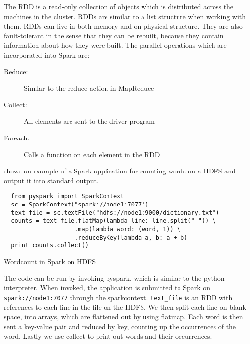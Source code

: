 The RDD is a read-only collection of objects which is distributed across the machines in the cluster. RDDs are similar to a list structure when working with them. RDDs can live in both memory and on physical structure. They are also fault-tolerant in the sense that they can be rebuilt, because they contain information about how they were built. The parallel operations which are incorporated into Spark are: 
\begin{description}
  \item[Reduce:] Similar to the reduce action in MapReduce 
  \item[Collect:] All elements are sent to the driver program
  \item[Foreach:] Calls a function on each element in the RDD
\end{description}
 shows an example of a Spark application for counting words on a HDFS and output it into standard output.
\begin{listing}[H]
\begin{verbatim}
  from pyspark import SparkContext
  sc = SparkContext("spark://node1:7077")
  text_file = sc.textFile("hdfs://node1:9000/dictionary.txt")
  counts = text_file.flatMap(lambda line: line.split(" ")) \
                    .map(lambda word: (word, 1)) \
                    .reduceByKey(lambda a, b: a + b)
  print counts.collect()
  \end{verbatim}
  \caption{Wordcount in Spark on HDFS}
  \label{lst:wordcount}
\end{listing} 
The code can be run by invoking pyspark, which is similar to the python interpreter. When invoked, the application is submitted to Spark on \texttt{spark://node1:7077} through the sparkcontext. \texttt{text\_file} is an RDD with references to each line in the file on the HDFS. We then split each line on blank space, into arrays, which are flattened out by using flatmap. Each word is then sent a key-value pair and reduced by key, counting up the occurrences of the word. Lastly we use collect to print out words and their occurrences.





